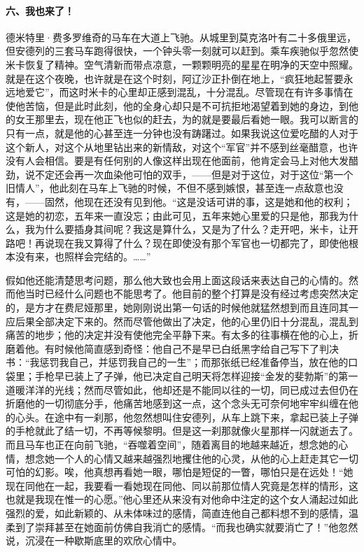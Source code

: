 \paragraph*{六、我也来了！}
\par 德米特里·费多罗维奇的马车在大道上飞驰。从城里到莫克洛叶有二十多俄里远，但安德列的三套马车跑得很快，一个钟头零一刻就可以赶到。乘车疾驰似乎忽然使米卡恢复了精神。空气清新而带点凉意，一颗颗明亮的星星在明净的天空中照耀。就是在这个夜晚，也许就是在这个时刻，阿辽沙正扑倒在地上，“疯狂地起誓要永远地爱它”，而这时米卡的心里却正感到混乱，十分混乱。尽管现在有许多事情在使他苦恼，但是此时此刻，他的全身心却只是不可抗拒地渴望着到她的身边，到他的女王那里去，现在他正飞也似的赶去，为的就是要最后看她一眼。我可以断言的只有一点，就是他的心甚至连一分钟也没有踌躇过。如果我说这位爱吃醋的人对于这个新人，对这个从地里钻出来的新情敌，对这个“军官”并不感到丝毫醋意，也许没有人会相信。要是有任何别的人像这样出现在他面前，他肯定会马上对他大发醋劲，说不定还会再一次血染他可怕的双手，——但是对于这位，对于这位“第一个旧情人”，他此刻在马车上飞驰的时候，不但不感到嫉恨，甚至连一点敌意也没有，——固然，他现在还没有见到他。“这是没话可讲的事，这是她和他的权利；这是她的初恋，五年来一直没忘；由此可见，五年来她心里爱的只是他，那我为什么，我为什么要插身其间呢？我这是算什么，又是为了什么？走开吧，米卡，让开路吧！再说现在我又算得了什么？现在即使没有那个军官也一切都完了，即使他根本没有来，也照样会完结的。……”
\par 假如他还能清楚思考问题，那么他大致也会用上面这段话来表达自己的心情的。然而他当时已经什么问题也不能思考了。他目前的整个打算是没有经过考虑突然决定的，是方才在费尼娅那里，她刚刚说出第一句话的时候他就猛然想到而且连同其一应后果全部决定下来的。然而尽管他做出了决定，他的心里仍旧十分混乱，混乱到痛苦的地步；他的决定并没有使他完全平静下来。有太多的往事横在他的心上，折磨着他。有时候他简直感到奇怪：他自己不是早已白纸黑字给自己写下了判决书：“我惩罚我自己，并惩罚我自己的一生”；而那张纸已经准备停当，放在他的口袋里；手枪早已装上了子弹，他已决定自己明天将怎样迎接“金发的斐勃斯”的第一道暖洋洋的光线；然而尽管如此，他却还是不能同以往的一切，同已成过去但仍在折磨他的一切彻底分手，他痛苦地感到这一点，这个念头无可奈何地牢牢纠缠在他的心头。在途中有一刹那，他忽然想叫住安德列，从车上跳下来，拿起已装上子弹的手枪就此了结一切，不再等候黎明。但是这一刹那就像火星那样一闪就逝去了。而且马车也正在向前飞驰，“吞噬着空间”，随着离目的地越来越近，想念她的心情，想念她一个人的心情又越来越强烈地攫住他的心灵，从他的心上赶走其它一切可怕的幻影。唉，他真想再看她一眼，哪怕是短促的一瞥，哪怕只是在远处！“她现在同他在一起，我要看一看她现在同他、同以前那位情人究竟是怎样的情形，这也就是我现在惟一的心愿。”他心里还从来没有对他命中注定的这个女人涌起过如此强烈的爱，如此新颖的、从未体味过的感情，简直连他自己都料想不到的感情，温柔到了崇拜甚至在她面前仿佛自我消亡的感情。“而我也确实就要消亡了！”他忽然说，沉浸在一种歇斯底里的欢欣心情中。
